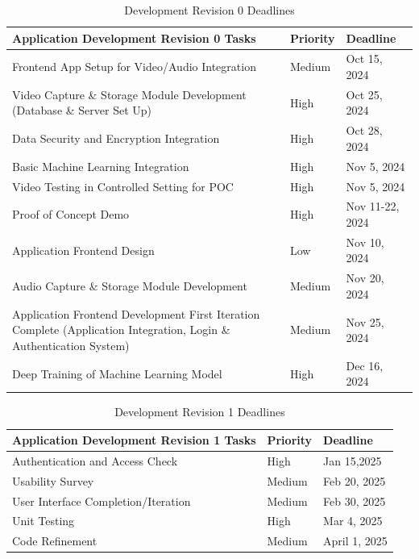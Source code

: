 \documentclass[12pt]{article}
\begin{document}
\begin{table}[H]
  \caption{Development Revision 0 Deadlines}
  \label{tab:rev0}
  \begin{tabularx}{\textwidth}{|p{8cm}|p{2cm}|X|}
  \hline
  \textbf{Application Development Revision 0 Tasks} & \textbf{Priority} &  \textbf{Deadline} \\
  \hline
  Frontend App Setup for Video/Audio Integration & Medium &  Oct 15, 2024 \\
  \hline
  Video Capture \& Storage Module Development (Database \& Server Set Up) & High &  Oct 25, 2024 \\
  \hline
  Data Security and Encryption Integration & High & Oct 28, 2024 \\
  \hline
  Basic Machine Learning Integration & High & Nov 5, 2024 \\
  \hline
  Video Testing in Controlled Setting for POC & High & Nov 5, 2024 \\
  \hline
  Proof of Concept Demo & High & Nov 11-22, 2024 \\
  \hline
  Application Frontend Design & Low & Nov 10, 2024 \\
  \hline
  Audio Capture \& Storage Module Development & Medium & Nov 20, 2024 \\
  \hline
  Application Frontend Development First Iteration Complete (Application Integration, Login \& Authentication System) & Medium & Nov 25, 2024 \\
  \hline
  Deep Training of Machine Learning Model & High & Dec 16, 2024 \\
  \hline
  \end{tabularx}
\end{table}

\begin{table}[H]
  \caption{Development Revision 1 Deadlines}
  \label{tab:rev1}
  \begin{tabularx}{\textwidth}{|p{8cm}|p{2cm}|X|}
  \hline
  \textbf{Application Development Revision 1 Tasks} & \textbf{Priority} & \textbf{Deadline} \\
  \hline
  Authentication and Access Check & High & Jan 15,2025 \\
  \hline 
  Usability Survey & Medium & Feb 20, 2025 \\
  \hline 
  User Interface Completion/Iteration & Medium & Feb 30, 2025 \\
  \hline 
  Unit Testing & High & Mar 4, 2025 \\
  \hline 
  Code Refinement & Medium & April 1, 2025 \\
  \hline
  \end{tabularx}
\end{table}
\end{document}
